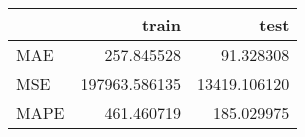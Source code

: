 \begin{tabular}{lrr}
\toprule
{} &          train &          test \\
\midrule
MAE  &     257.845528 &     91.328308 \\
MSE  &  197963.586135 &  13419.106120 \\
MAPE &     461.460719 &    185.029975 \\
\bottomrule
\end{tabular}
